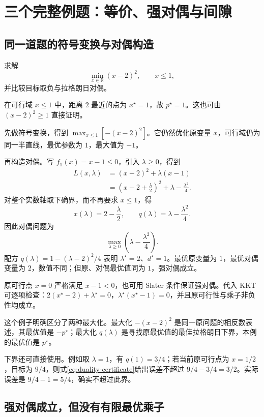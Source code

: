 \documentclass[UTF8,12pt,a4paper,fontset=fandol]{ctexart}
\begin{document}
\section{三个完整例题：等价、强对偶与间隙}
\label{sec:duality-examples}

\subsection{同一道题的符号变换与对偶构造}

\begin{example}[带上界约束的二次目标]
\label{ex:duality-quadratic}
求解
\[
 \min_{x\in\mathbb R}(x-2)^2,\qquad x\leq1,
\]
并比较目标取负与拉格朗日对偶。
\end{example}
\begin{solve}
在可行域 $x\leq1$ 中，距离 $2$ 最近的点为 $x^\star=1$，故 $p^\star=1$。这也可由 $(x-2)^2\geq1$ 直接证明。

先做符号变换，得到 $\max_{x\leq1}[-(x-2)^2]$。它仍然优化原变量 $x$，可行域仍为同一半直线，最优参数为 $1$，最大值为 $-1$。

再构造对偶。写 $f_1(x)=x-1\leq0$，引入 $\lambda\geq0$，得到
\begin{align*}
 L(x,\lambda)
 &=(x-2)^2+\lambda(x-1)\\
 &=\left(x-2+\frac\lambda2\right)^2
       +\lambda-\frac{\lambda^2}{4}.
\end{align*}
对整个实数轴取下确界，而不再要求 $x\leq1$，得
\[
 x(\lambda)=2-\frac\lambda2,
 \qquad q(\lambda)=\lambda-\frac{\lambda^2}{4}.
\]
因此对偶问题为
\[
 \max_{\lambda\geq0}\left(\lambda-\frac{\lambda^2}{4}\right).
\]
配方 $q(\lambda)=1-(\lambda-2)^2/4$ 表明 $\lambda^\star=2$、$d^\star=1$。最优原变量为 $1$，最优对偶变量为 $2$，数值不同；但原、对偶最优值同为 $1$，强对偶成立。

原可行点 $x=0$ 严格满足 $x-1<0$，也可用 Slater 条件保证强对偶。代入 KKT 可逐项检查：$2(x^\star-2)+\lambda^\star=0$，$\lambda^\star(x^\star-1)=0$，并且原可行性与乘子非负性均成立。
\end{solve}

这个例子明确区分了两种最大化。最大化 $-(x-2)^2$ 是同一原问题的相反数表述，其最优值是 $-p^\star$；最大化 $q(\lambda)$ 是寻找原最优值的最佳拉格朗日下界，本例的最优值是 $p^\star$。

下界还可直接使用。例如取 $\lambda=1$，有 $q(1)=3/4$；若当前原可行点为 $x=1/2$，目标为 $9/4$，则式\eqref{eq:duality-certificate}给出误差不超过 $9/4-3/4=3/2$。实际误差是 $9/4-1=5/4$，确实不超过此界。

\subsection{强对偶成立，但没有有限最优乘子}
\end{document}
